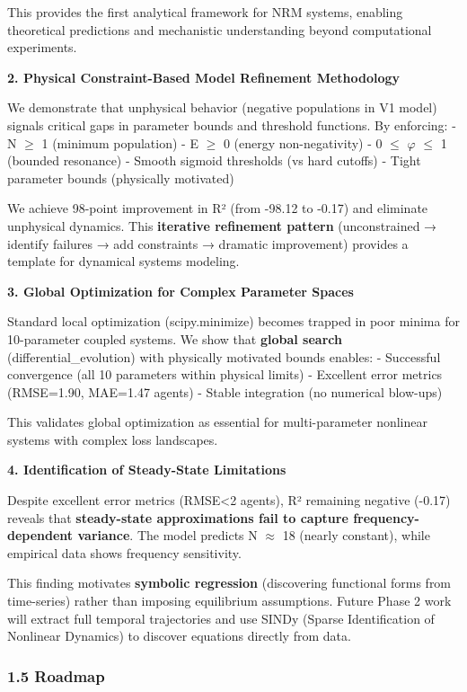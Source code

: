 \documentclass[
]{article}
\begin{document}
This provides the first analytical framework for NRM systems, enabling
theoretical predictions and mechanistic understanding beyond
computational experiments.

\textbf{2. Physical Constraint-Based Model Refinement Methodology}

We demonstrate that unphysical behavior (negative populations in V1
model) signals critical gaps in parameter bounds and threshold
functions. By enforcing: - N $\geq$ 1 (minimum population) - E $\geq$ 0 (energy
non-negativity) - 0 $\leq$ $\varphi$ $\leq$ 1 (bounded resonance) - Smooth sigmoid
thresholds (vs hard cutoffs) - Tight parameter bounds (physically
motivated)

We achieve 98-point improvement in R² (from -98.12 to -0.17) and
eliminate unphysical dynamics. This \textbf{iterative refinement
pattern} (unconstrained → identify failures → add constraints → dramatic
improvement) provides a template for dynamical systems modeling.

\textbf{3. Global Optimization for Complex Parameter Spaces}

Standard local optimization (scipy.minimize) becomes trapped in poor
minima for 10-parameter coupled systems. We show that \textbf{global
search} (differential\_evolution) with physically motivated bounds
enables: - Successful convergence (all 10 parameters within physical
limits) - Excellent error metrics (RMSE=1.90, MAE=1.47 agents) - Stable
integration (no numerical blow-ups)

This validates global optimization as essential for multi-parameter
nonlinear systems with complex loss landscapes.

\textbf{4. Identification of Steady-State Limitations}

Despite excellent error metrics (RMSE\textless2 agents), R² remaining
negative (-0.17) reveals that \textbf{steady-state approximations fail
to capture frequency-dependent variance}. The model predicts N $\approx$ 18
(nearly constant), while empirical data shows frequency sensitivity.

This finding motivates \textbf{symbolic regression} (discovering
functional forms from time-series) rather than imposing equilibrium
assumptions. Future Phase 2 work will extract full temporal trajectories
and use SINDy (Sparse Identification of Nonlinear Dynamics) to discover
equations directly from data.

\subsubsection{1.5 Roadmap}\label{roadmap}
\end{document}
